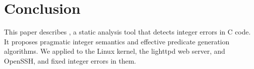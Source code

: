 \section{Conclusion}
\label{s:concl}

This paper describes \sys, a static analysis tool that detects
integer errors in C code.  It proposes pragmatic integer
semantics and effective predicate generation algorithms.
We applied \sys to the Linux kernel, the lighttpd web server, and
OpenSSH, and fixed \nrbugs integer errors in them.

